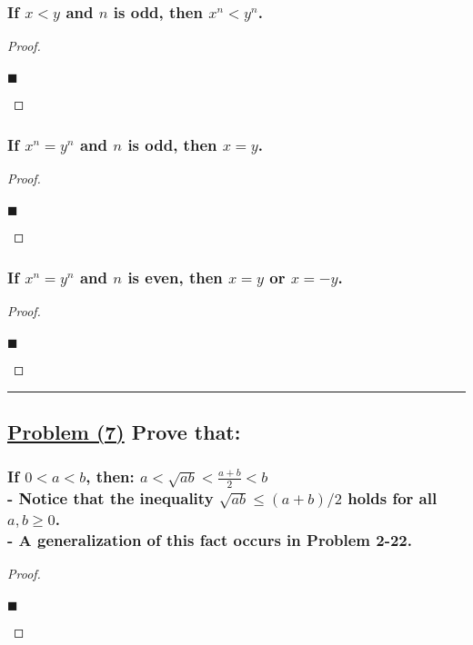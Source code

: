 \documentclass[letterpaper, 10 pt, conference]{ieeeconf}  %
\begin{document}
\subsubsection{\textbf{If $x < y$ and $n$ is odd, then $x^n < y^n$.}}
\begin{proof}
\begin{align}
    
\end{align}
\begin{flushright}
$\blacksquare$
\end{flushright}
\end{proof}

\subsubsection{\textbf{If $x^n = y^n$ and $n$ is odd, then $x = y$.}}
\begin{proof}
\begin{align}
    
\end{align}
\begin{flushright}
$\blacksquare$
\end{flushright}
\end{proof}


\subsubsection{\textbf{If $x^n = y^n$ and $n$ is even, then $x = y$ or $x = -y$.}}
\begin{proof}
\begin{align}
    
\end{align}
\begin{flushright}
$\blacksquare$
\end{flushright}
\end{proof}


\noindent\rule{8cm}{0.4pt}

\subsection{\textbf{\underline{Problem (7)} Prove that:}}

\subsubsection{\textbf{If $0 < a < b$, then: $a < \sqrt{ab} < \frac{a + b}{2} < b$ \\ - Notice that the inequality $\sqrt{ab} \leq (a + b) / 2$ holds for all $a, b \geq 0$. \\ - A generalization of this fact occurs in Problem 2-22.}}
\begin{proof}
\begin{align}
    
\end{align}
\begin{flushright}
$\blacksquare$
\end{flushright}
\end{proof}
\end{document}
